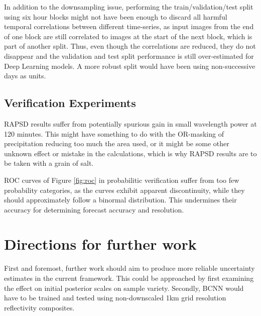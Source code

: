 In addition to the downsampling issue, performing the train/validation/test split using six hour blocks might not have been enough to discard all harmful temporal correlations between different time-series, as input images from the end of one block are still correlated to images at the start of the next block, which is part of another split. Thus, even though the correlations are reduced, they do not disappear and the validation and test split performance is still over-estimated for Deep Learning models. A more robust split would have been using non-successive days as units.

\subsection*{Verification Experiments}

RAPSD results suffer from potentially spurious gain in small wavelength power at 120 minutes. This might have something to do with the OR-masking of precipitation reducing too much the area used, or it might be some other unknown effect or mistake in the calculations, which is why RAPSD results are to be taken with a grain of salt. 

ROC curves of Figure \ref{fig:roc} in probabilitic verification suffer from too few probability categories, as the curves exhibit apparent discontinuity, while they should approximately follow a binormal distribution. This undermines their accuracy for determining forecast accuracy and resolution.

\section{Directions for further work}

First and foremost, further work should aim to produce more reliable uncertainty estimates in the current framework. This could be approached by first examining the effect on initial posterior scales on sample variety. Secondly, BCNN would have to be trained and tested using non-downscaled 1km grid resolution reflectivity composites. 

